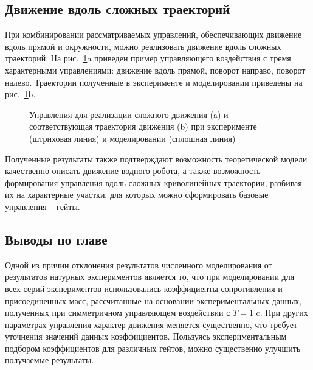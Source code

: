 \subsection{Движение вдоль сложных траекторий}

При комбинировании рассматриваемых управлений, обеспечивающих движение вдоль прямой и окружности, можно реализовать движение вдоль сложных траекторий. На рис.~\ref{Slalom}a приведен пример управляющего воздействия с тремя характерными управлениями: движение вдоль прямой, поворот направо, поворот налево.   Траектории полученные в эксперименте и моделировании приведены на рис.~\ref{Slalom}b.

\begin{figure}[!ht]
	\begin{minipage}[h]{0.5\linewidth}
	\end{minipage}
	\hfill
	\begin{minipage}[h]{0.5\linewidth}
	\end{minipage}
	\caption{Управления для реализации сложного движения (a) и соответствующая траектория движения (b)  при эксперименте (штриховая линия) и моделировании (сплошная линия)}
	\label{Slalom}
\end{figure}


Полученные результаты также подтверждают возможность теоретической модели качественно описать движение водного робота, а также возможность формирования управления вдоль сложных криволинейных траектории, разбивая их на характерные участки, для которых можно сформировать базовые управления -- гейты. 

\subsection{Выводы по главе}

Одной из причин отклонения результатов численного моделирования от результатов натурных экспериментов является то, что при моделировании для всех серий экспериментов использовались коэффициенты сопротивления и присоединенных масс, рассчитанные на основании экспериментальных  данных, полученных при симметричном управляющем воздействии с $T = 1$ c. При других параметрах управления характер движения меняется существенно, что требует уточнения значений данных коэффициентов. Пользуясь экспериментальным подбором коэффициентов для различных гейтов, можно существенно улучшить получаемые результаты.

